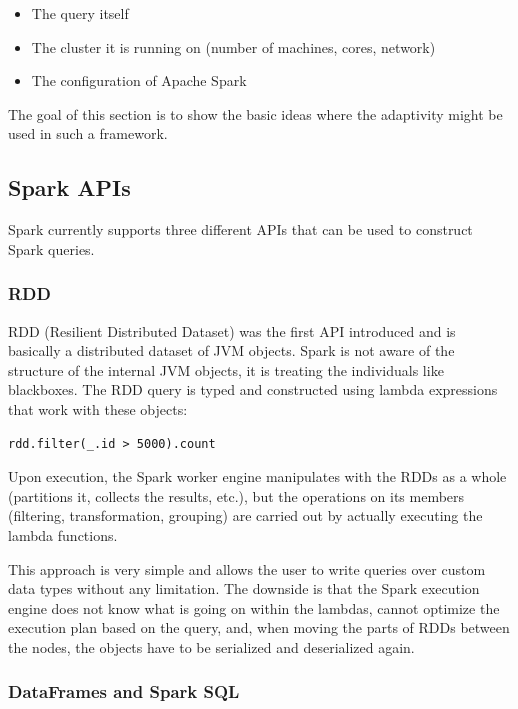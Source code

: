 \begin{itemize}
	\item The query itself
	\item The cluster it is running on (number of machines, cores, network)
	\item The configuration of Apache Spark
\end{itemize}

The goal of this section is to show the basic ideas where the adaptivity might be used in such a framework.

\subsection{Spark APIs}
\label{subsec:spark_apis}

Spark currently supports three different APIs that can be used to construct Spark queries.

\subsubsection{RDD}

RDD (Resilient Distributed Dataset) was the first API introduced and is basically a distributed dataset of JVM objects. Spark is not aware of the structure of the internal JVM objects, it is treating the individuals like blackboxes. The RDD query is typed and constructed using lambda expressions that work with these objects:

\lstset{style=Scala}
\begin{lstlisting}
rdd.filter(_.id > 5000).count
\end{lstlisting}

Upon execution, the Spark worker engine manipulates with the RDDs as a whole (partitions it, collects the results, etc.), but the operations on its members (filtering, transformation, grouping) are carried out by actually executing the lambda functions.

This approach is very simple and allows the user to write queries over custom data types without any limitation. The downside is that the Spark execution engine does not know what is going on within the lambdas, cannot optimize the execution plan based on the query, and, when moving the parts of RDDs between the nodes, the objects have to be serialized and deserialized again.

\subsubsection{DataFrames and Spark SQL}

